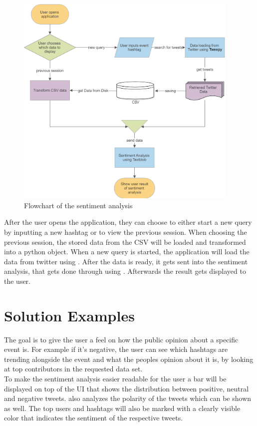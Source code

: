 \documentclass[a4paper,oneside,11pt]{scrreprt}
\begin{document}
\begin{figure}[h]
    \centering
    \caption{Flowchart of the sentiment analysis}
    \includegraphics[width=0.95\textwidth]{media/sentiment_analysis_flowchart.png}
\end{figure}

After the user opens the application, they can choose to either start a new query by inputting a new hashtag or to view the previous session. When choosing the previous session, the stored data from the CSV will be loaded and transformed into a python object. When a new query is started, the application will load the data from twitter using . After the data is ready, it gets sent into the sentiment analysis, that gets done through using . Afterwards the result gets displayed to the user.


\chapter{Solution Examples}

The goal is to give the user a feel on how the public opinion about a specific event is. For example if it's negative, the user can see which hashtags are trending alongside the event and what the peoples opinion about it is, by looking at top contributors in the requested data set. \\

To make the sentiment analysis easier readable for the user a bar will be displayed on top of the UI that shows the distribution between positive, neutral and negative tweets.  also analyzes the polarity of the tweets which can be shown as well. The top users and hashtags will also be marked with a clearly visible color that indicates the sentiment of the respective tweets.
\end{document}
